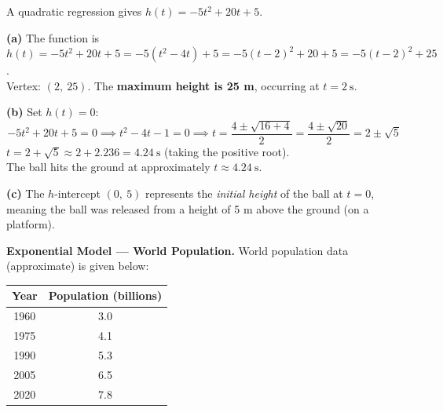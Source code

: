 \documentclass[addpoints]{exam}
\begin{document}
\begin{questions}
A quadratic regression gives $h(t) = -5t^2 + 20t + 5$.


\begin{solution}
\textbf{(a)} The function is $h(t) = -5t^2 + 20t + 5 = -5(t^2 - 4t) + 5 = -5(t-2)^2 + 20 + 5 = -5(t-2)^2 + 25$.\\
Vertex: $(2,\ 25)$. The \textbf{maximum height is 25 m}, occurring at $t = 2\ \text{s}$.

\textbf{(b)} Set $h(t) = 0$:
\[
-5t^2 + 20t + 5 = 0 \implies t^2 - 4t - 1 = 0 \implies t = \frac{4 \pm \sqrt{16+4}}{2} = \frac{4 \pm \sqrt{20}}{2} = 2 \pm \sqrt{5}
\]
$t = 2 + \sqrt{5} \approx 2 + 2.236 = 4.24\ \text{s}$ (taking the positive root).\\
The ball hits the ground at approximately $t \approx 4.24\ \text{s}$.

\textbf{(c)} The $h$-intercept $(0,\ 5)$ represents the \textit{initial height} of the ball at $t = 0$, meaning the ball was released from a height of 5 m above the ground (on a platform).
\end{solution}

\vspace{5mm}

\question[8]
\textbf{Exponential Model --- World Population.}
World population data (approximate) is given below:

\begin{center}
\begin{tabular}{@{}cc@{}}
\toprule
Year & Population (billions) \\
\midrule
1960 & 3.0 \\
1975 & 4.1 \\
1990 & 5.3 \\
2005 & 6.5 \\
2020 & 7.8 \\
\bottomrule
\end{tabular}
\end{center}


\end{questions}
\end{document}
